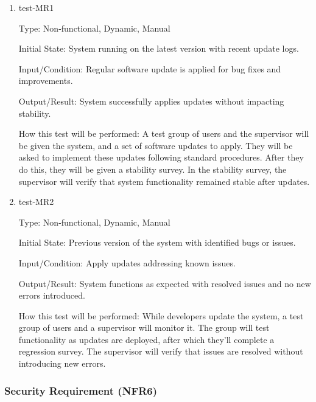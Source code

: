 \documentclass[12pt, titlepage]{article}
\begin{document}
\begin{enumerate}
    \item{test-MR1} \label{test-MR1}
    
    Type: Non-functional, Dynamic, Manual
    
    Initial State: System running on the latest version with recent update logs.
    
    Input/Condition: Regular software update is applied for bug fixes and improvements.
    
    Output/Result: System successfully applies updates without impacting stability.
    
    How this test will be performed: A test group of users and the supervisor will be given the system, and a set of software updates to apply. They will be asked to implement these updates following standard procedures. After they do this, they will be given a stability survey. In the stability survey, the supervisor will verify that system functionality remained stable after updates.


    \item{test-MR2} \label{test-MR2}
    
    Type: Non-functional, Dynamic, Manual

    Initial State: Previous version of the system with identified bugs or issues.

    Input/Condition: Apply updates addressing known issues.

    Output/Result: System functions as expected with resolved issues and no new errors introduced.

    How this test will be performed: While developers update the system, a test group of users and a supervisor will monitor it. The group will test functionality as updates are deployed, after which they'll complete a regression survey. The supervisor will verify that issues are resolved without introducing new errors.
\end{enumerate}

\subsubsection{Security Requirement (NFR6)} \label{section:4.2.6}
\end{document}
